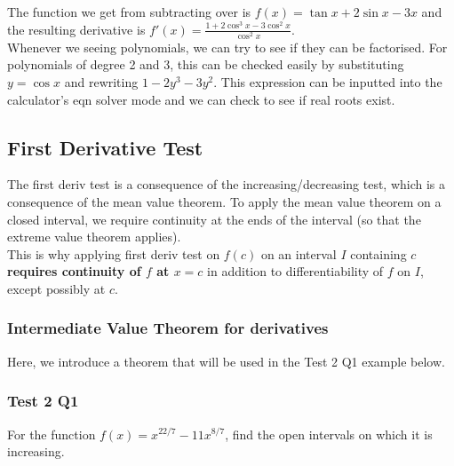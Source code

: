 \documentclass{article}
\begin{document}
The function we get from subtracting over is $f(x)=\tan x+2\sin x-3x$ and the resulting derivative is $f'(x)=\frac{1+2\cos^3x-3\cos^2x}{\cos^2x}$.\\
Whenever we seeing polynomials, we can try to see if they can be factorised. For polynomials of degree 2 and 3, this can be checked easily by substituting $y=\cos x$ and rewriting $1-2y^3-3y^2$. This expression can be inputted into the calculator's eqn solver mode and we can check to see if real roots exist.

\subsection{First Derivative Test}
The first deriv test is a consequence of the increasing/decreasing test, which is a consequence of the mean value theorem.
To apply the mean value theorem on a closed interval, we require continuity at the ends of the interval (so that the extreme value theorem applies).\\
This is why applying first deriv test on $f(c)$ on an interval $I$ containing $c$ \textbf{requires continuity of $f$ at $x=c$} in addition to differentiability of $f$ on $I$, except possibly at $c$.

\subsubsection{Intermediate Value Theorem for derivatives}
Here, we introduce a theorem that will be used in the Test 2 Q1 example below.\\



\subsubsection{Test 2 Q1}
For the function $f(x)=x^{22/7}-11x^{8/7}$,
find the open intervals on which it is increasing.
\end{document}
